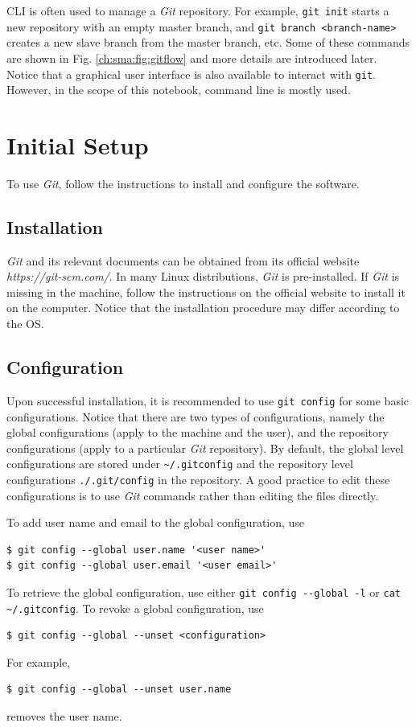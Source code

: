CLI is often used to manage a \textit{Git} repository. For example, \verb|git init| starts a new repository with an empty master branch, and \verb|git branch <branch-name>| creates a new slave branch from the master branch, etc. Some of these commands are shown in Fig. \ref{ch:sma:fig:gitflow} and more details are introduced later. Notice that a graphical user interface is also available to interact with \verb|git|. However, in the scope of this notebook, command line is mostly used.

\section{Initial Setup}

To use \textit{Git}, follow the instructions to install and configure the software.

\subsection{Installation}

\textit{Git} and its relevant documents can be obtained from its official website \textit{https://git-scm.com/}. In many Linux distributions, \textit{Git} is pre-installed. If \textit{Git} is missing in the machine, follow the instructions on the official website to install it on the computer. Notice that the installation procedure may differ according to the OS.

\subsection{Configuration}

Upon successful installation, it is recommended to use \verb|git config| for some basic configurations. Notice that there are two types of configurations, namely the global configurations (apply to the machine and the user), and the repository configurations (apply to a particular \textit{Git} repository). By default, the global level configurations are stored under \verb|~/.gitconfig| and the repository level configurations \verb|./.git/config| in the repository. A good practice to edit these configurations is to use \textit{Git} commands rather than editing the files directly.

To add user name and email to the global configuration, use
\begin{lstlisting}
$ git config --global user.name '<user name>'
$ git config --global user.email '<user email>'
\end{lstlisting}
To retrieve the global configuration, use either \verb|git config --global -l| or \verb|cat ~/.gitconfig|. To revoke a global configuration, use
\begin{lstlisting}
$ git config --global --unset <configuration>
\end{lstlisting}
For example,
\begin{lstlisting}
$ git config --global --unset user.name
\end{lstlisting}
removes the user name.

